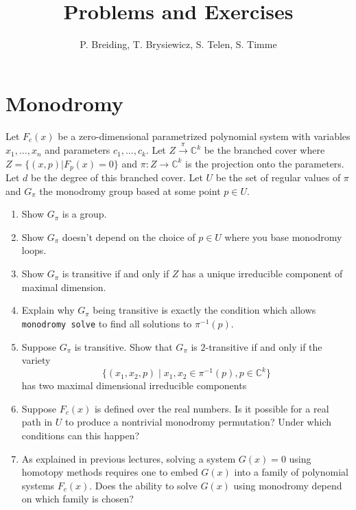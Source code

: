 \documentclass[11pt,reqno]{amsart}
\title{Problems and Exercises}
\author{P. Breiding, T. Brysiewicz, S. Telen, S. Timme}
\theoremstyle{definition}
\theoremstyle{remark}
\numberwithin{equation}{section}
\newcommand{\C}{\mathbb{C}}
\begin{document}
\maketitle

\section{Monodromy}
Let $F_c(x)$ be a zero-dimensional parametrized polynomial system with variables $x_1,\ldots,x_n$ and parameters $c_1,\ldots,c_k$. Let $Z \xrightarrow{\pi} \C^k$ be the branched cover where $Z=\{(x,p) | F_p(x)=0\}$ and $\pi:Z \to \C^k$ is the projection onto the parameters. Let $d$ be the degree of this branched cover.
Let $U$ be the set of regular values of $\pi$ and $G_\pi$ the monodromy group based at some point $p \in U$. 

\begin{enumerate}
\item Show $G_\pi$ is a group.

\item Show $G_\pi$ doesn't depend on the choice of $p \in U$ where you base monodromy loops. 


\item Show $G_\pi$ is transitive if and only if $Z$ has a unique irreducible component of maximal dimension.

\item Explain why $G_\pi$ being transitive is exactly the condition which allows \texttt{monodromy solve} to find all solutions to $\pi^{-1}(p)$.

\item Suppose $G_\pi$ is transitive. Show that $G_\pi$ is $2$-transitive if and only if the variety 
$$\{(x_1,x_2,p) \mid x_1,x_2 \in \pi^{-1}(p), p \in \C^k \}$$
has two maximal dimensional irreducible components 

\item Suppose $F_c(x)$ is defined over the real numbers.
 Is it possible for a real path in $U$ to produce a nontrivial monodromy permutation? Under which conditions can this happen?
 
\item As explained in previous lectures, solving a system $G(x)=0$ using homotopy methods requires one to embed $G(x)$ into a family of polynomial systems $F_c(x)$. Does the ability to solve $G(x)$ using monodromy depend on which family is chosen? 


\end{enumerate}
\end{document}
